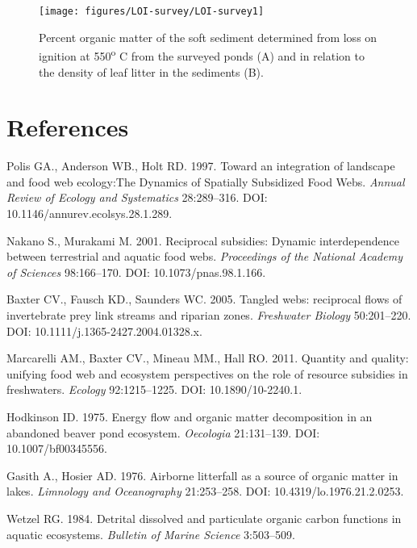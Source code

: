 \documentclass[12pt,letter]{article}
\begin{document}
\begin{figure}[h!]
\begin{center}
\texttt{[image: figures/LOI-survey/LOI-survey1]}
\caption{{\label{fig:LOI_survey}
Percent organic matter of the soft sediment determined from loss on ignition at 550\textsuperscript{o} C from the surveyed ponds (A) and in relation to the density of leaf litter in the sediments (B).%
}}
\end{center}
\end{figure}

\section*{References}\sloppy
{}
\label{csl:1}Polis GA., Anderson WB., Holt RD. 1997. {{Toward} {an} {integration} {of} {landscape} {and} {food} {web} {ecology}:The Dynamics of Spatially Subsidized Food Webs}. \textit{Annual Review of Ecology and Systematics} 28:289–316. DOI: 10.1146/annurev.ecolsys.28.1.289.

\label{csl:2}Nakano S., Murakami M. 2001. {Reciprocal subsidies: Dynamic interdependence between terrestrial and aquatic food webs}. \textit{Proceedings of the National Academy of Sciences} 98:166–170. DOI: 10.1073/pnas.98.1.166.

\label{csl:3}Baxter CV., Fausch KD., Saunders WC. 2005. {Tangled webs: reciprocal flows of invertebrate prey link streams and riparian zones}. \textit{Freshwater Biology} 50:201–220. DOI: 10.1111/j.1365-2427.2004.01328.x.

\label{csl:4}Marcarelli AM., Baxter CV., Mineau MM., Hall RO. 2011. {Quantity and quality: unifying food web and ecosystem perspectives on the role of resource subsidies in freshwaters}. \textit{Ecology} 92:1215–1225. DOI: 10.1890/10-2240.1.

\label{csl:5}Hodkinson ID. 1975. {Energy flow and organic matter decomposition in an abandoned beaver pond ecosystem}. \textit{Oecologia} 21:131–139. DOI: 10.1007/bf00345556.

\label{csl:6}Gasith A., Hosier AD. 1976. {Airborne litterfall as a source of organic matter in lakes}. \textit{Limnology and Oceanography} 21:253–258. DOI: 10.4319/lo.1976.21.2.0253.

\label{csl:7}Wetzel RG. 1984. {Detrital dissolved and particulate organic carbon functions in aquatic ecosystems}. \textit{Bulletin of Marine Science} 3:503–509.
\end{document}
